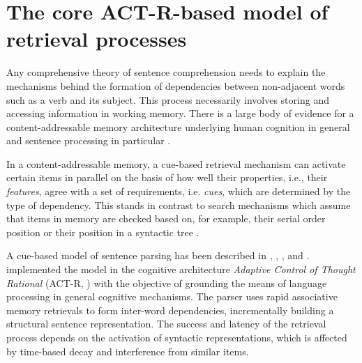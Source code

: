 \documentclass{cambridge7A}\usepackage[]{graphicx}\usepackage[]{color}
\begin{document}

\chapter{The core ACT-R-based model of retrieval processes} \label{c02}

Any comprehensive theory of sentence comprehension needs to explain the mechanisms behind the formation of dependencies between non-adjacent words such as a verb and its subject. This process necessarily involves storing and accessing information in working memory.  There is a large body of evidence for a content-addressable memory architecture underlying human cognition in general \citep{WatkinsWatkins1975, AndersonLebiere1998,AndersonEtAl2004,Ratcliff1978} and sentence processing in particular \citep{McElree2000,McElreeForakerDyer2003, VanDykeLewis2003, LewisVasishth2005, VanDykeMcElree2011}. 

In a content-addressable memory, a cue-based retrieval mechanism can activate certain items in parallel on the basis of how well their properties, i.e., their \textit{features}, agree with a set of requirements, i.e. \textit{cues}, which are determined by the type of dependency.
This stands in contrast to search mechanisms which assume that items in memory are checked based on, for example, their  serial order position \citep{Sternberg1966,Sternberg1969,BerwickWeinberg1984} or their position in a syntactic tree \citep{Sturt2003}. 

A cue-based model of sentence parsing has been described in 
\cite{VanDykeLewis2003}, \cite{LewisVasishth2005}, \cite{LewisVasishthVanDyke2006}, and \cite{VasishthLewis2006}. 
\cite{LewisVasishth2005} implemented the model in the cognitive architecture  \emph{Adaptive Control of Thought Rational}  (ACT-R, \citealp{AndersonLebiere1998, AndersonEtAl2004}) with the objective of grounding the means of language processing in general cognitive mechanisms.
The parser uses rapid associative memory retrievals to form inter-word dependencies, incrementally building a structural sentence representation. The success and latency of the retrieval process depends on the activation of syntactic representations, which is affected by time-based decay and interference from similar items. 
\end{document}
